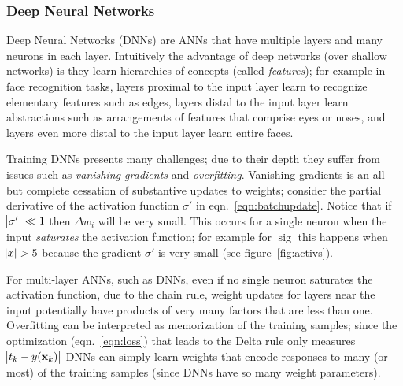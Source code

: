 \subsubsection{Deep Neural Networks}\label{subsubsec:dnns}

%
Deep Neural Networks (DNNs) are ANNs that have multiple layers and many neurons in each layer.
%
Intuitively the advantage of deep networks (over shallow networks) is they learn hierarchies of concepts (called \textit{features}); for example in face recognition tasks, layers proximal to the input layer learn to recognize elementary features such as edges, layers distal to the input layer learn abstractions such as arrangements of features that comprise eyes or noses, and layers even more distal to the input layer learn entire faces.

Training DNNs presents many challenges; due to their depth they suffer from issues such as \textit{vanishing gradients} and \textit{overfitting}.
%
Vanishing gradients is an all but complete cessation of substantive updates to weights; consider the partial derivative of the activation function \(\sigma'\) in eqn.~\eqref{eqn:batchupdate}.
%
Notice that if \(\abs{\sigma'} \ll 1\) then \(\Delta w_i\) will be very small.
%
This occurs for a single neuron when the input \textit{saturates} the activation function; for example for \(\operatorname{sig}\) this happens when \(\abs{x} > 5\) because the gradient \(\sigma'\) is very small (see figure~\ref{fig:activs}).

%
For multi-layer ANNs, such as DNNs, even if no single neuron saturates the activation function,
due to the chain rule, weight updates for layers near the input potentially have products of very many factors that are less than one.
%
Overfitting can be interpreted as memorization of the training samples; since the optimization (eqn.~\eqref{eqn:loss}) that leads to the Delta rule only measures \(\abs{t_k - y(\mathbf{x}_k)}\) DNNs can simply learn weights that encode responses to many (or most) of the training samples (since DNNs have so many weight parameters).

